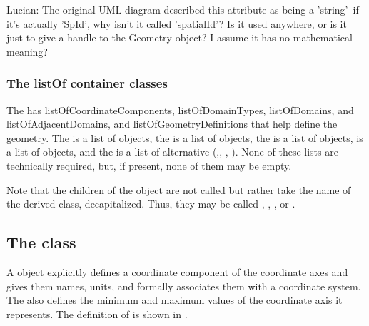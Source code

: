 {\color{red} Lucian: \notice The original UML diagram described this attribute as being a 'string'--if it's actually 'SpId', why isn't it called 'spatialId'?  Is it used anywhere, or is it just to give a handle to the Geometry object?  I assume it has no mathematical meaning?}

\subsubsection{The listOf container classes}
The \Geometry has listOfCoordinateComponents, listOfDomainTypes, listOfDomains, and listOfAdjacentDomains, and listOfGeometryDefinitions that help define the geometry.  The \ListOfCoordinateComponents is a list of \CoordinateComponent objects, the \ListOfDomainTypes is a list of \DomainType objects, the \ListOfDomains is a list of \Domain objects, \ListOfAdjacentDomains is a list of \AdjacentDomains objects, and the \ListOfGeometryDefinitions is a list of alternative \GeometryDefinitions (\ParametricGeometry,\CSGeometry, \SampledFieldGeometry, \AnalyticGeometry).  None of these lists are technically required, but, if present, none of them may be empty.

Note that the children of the \ListOfGeometryDefinitions object are not called  but rather take the name of the derived class, decapitalized.  Thus, they may be called , , , or .


\subsection{The  class}
\label{CoordinateComponent-class}
A \CoordinateComponent object explicitly defines a coordinate component of the coordinate axes and gives them names, units, and formally associates them with a coordinate system. The \CoordinateComponent also defines the minimum and maximum values of the coordinate axis it represents. The definition of \CoordinateComponent is shown in .
 
